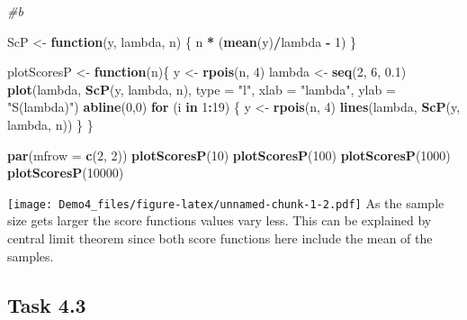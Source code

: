 \documentclass[
]{article}
\newenvironment{Shaded}{\begin{snugshade}}{\end{snugshade}}
\newcommand{\AttributeTok}[1]{\textcolor[rgb]{0.13,0.29,0.53}{#1}}
\newcommand{\CommentTok}[1]{\textcolor[rgb]{0.56,0.35,0.01}{\textit{#1}}}
\newcommand{\ControlFlowTok}[1]{\textcolor[rgb]{0.13,0.29,0.53}{\textbf{#1}}}
\newcommand{\DecValTok}[1]{\textcolor[rgb]{0.00,0.00,0.81}{#1}}
\newcommand{\FloatTok}[1]{\textcolor[rgb]{0.00,0.00,0.81}{#1}}
\newcommand{\FunctionTok}[1]{\textcolor[rgb]{0.13,0.29,0.53}{\textbf{#1}}}
\newcommand{\NormalTok}[1]{#1}
\newcommand{\OtherTok}[1]{\textcolor[rgb]{0.56,0.35,0.01}{#1}}
\newcommand{\SpecialCharTok}[1]{\textcolor[rgb]{0.81,0.36,0.00}{\textbf{#1}}}
\newcommand{\StringTok}[1]{\textcolor[rgb]{0.31,0.60,0.02}{#1}}
\begin{document}
\begin{Shaded}
\begin{Highlighting}[]
\CommentTok{\#b}

\NormalTok{ScP }\OtherTok{\textless{}{-}} \ControlFlowTok{function}\NormalTok{(y, lambda, n) \{ n }\SpecialCharTok{*}\NormalTok{ (}\FunctionTok{mean}\NormalTok{(y)}\SpecialCharTok{/}\NormalTok{lambda }\SpecialCharTok{{-}} \DecValTok{1}\NormalTok{) \}}

\NormalTok{plotScoresP }\OtherTok{\textless{}{-}} \ControlFlowTok{function}\NormalTok{(n)\{}
\NormalTok{  y }\OtherTok{\textless{}{-}} \FunctionTok{rpois}\NormalTok{(n, }\DecValTok{4}\NormalTok{)}
\NormalTok{  lambda }\OtherTok{\textless{}{-}} \FunctionTok{seq}\NormalTok{(}\DecValTok{2}\NormalTok{, }\DecValTok{6}\NormalTok{, }\FloatTok{0.1}\NormalTok{)}
  \FunctionTok{plot}\NormalTok{(lambda, }\FunctionTok{ScP}\NormalTok{(y, lambda, n), }\AttributeTok{type =} \StringTok{"l"}\NormalTok{, }\AttributeTok{xlab =} \StringTok{"lambda"}\NormalTok{, }\AttributeTok{ylab =} \StringTok{"S(lambda)"}\NormalTok{)}
  \FunctionTok{abline}\NormalTok{(}\DecValTok{0}\NormalTok{,}\DecValTok{0}\NormalTok{)}
  \ControlFlowTok{for}\NormalTok{ (i }\ControlFlowTok{in} \DecValTok{1}\SpecialCharTok{:}\DecValTok{19}\NormalTok{) \{}
\NormalTok{  y }\OtherTok{\textless{}{-}} \FunctionTok{rpois}\NormalTok{(n, }\DecValTok{4}\NormalTok{)}
  \FunctionTok{lines}\NormalTok{(lambda, }\FunctionTok{ScP}\NormalTok{(y, lambda, n))}
\NormalTok{  \}}
\NormalTok{\}}

\FunctionTok{par}\NormalTok{(}\AttributeTok{mfrow =} \FunctionTok{c}\NormalTok{(}\DecValTok{2}\NormalTok{, }\DecValTok{2}\NormalTok{))}
\FunctionTok{plotScoresP}\NormalTok{(}\DecValTok{10}\NormalTok{)}
\FunctionTok{plotScoresP}\NormalTok{(}\DecValTok{100}\NormalTok{)}
\FunctionTok{plotScoresP}\NormalTok{(}\DecValTok{1000}\NormalTok{)}
\FunctionTok{plotScoresP}\NormalTok{(}\DecValTok{10000}\NormalTok{)}
\end{Highlighting}
\end{Shaded}

\texttt{[image: Demo4\_files/figure-latex/unnamed-chunk-1-2.pdf]} As the
sample size gets larger the score functions values vary less. This can
be explained by central limit theorem since both score functions here
include the mean of the samples.

\hypertarget{task-4.3}{%
\subsection{Task 4.3}\label{task-4.3}}
\end{document}
